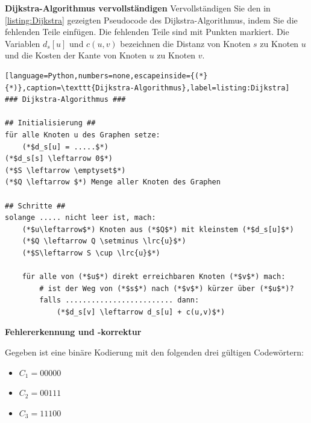 \begin{questions}
\clearpage

\question[3]
\textbf{Dijkstra-Algorithmus vervollständigen}
Vervollständigen Sie den in \cref{listing:Dijkstra} gezeigten Pseudocode des Dijkstra-Algorithmus, indem Sie die fehlenden Teile einfügen. Die fehlenden Teile sind mit Punkten markiert. Die Variablen $d_s[u]$ und $c(u,v)$ bezeichnen die Distanz von Knoten $s$ zu Knoten $u$ und die Kosten der Kante von Knoten $u$ zu Knoten $v$.
\begin{lstlisting}[language=Python,numbers=none,escapeinside={(*}{*)},caption=\texttt{Dijkstra-Algorithmus},label=listing:Dijkstra]
### Dijkstra-Algorithmus ###

## Initialisierung ##
für alle Knoten u des Graphen setze:
    (*$d_s[u] = .....$*)
(*$d_s[s] \leftarrow 0$*)
(*$S \leftarrow \emptyset$*)
(*$Q \leftarrow $*) Menge aller Knoten des Graphen

## Schritte ##
solange ..... nicht leer ist, mach:
    (*$u\leftarrow$*) Knoten aus (*$Q$*) mit kleinstem (*$d_s[u]$*)
    (*$Q \leftarrow Q \setminus \lrc{u}$*)
    (*$S\leftarrow S \cup \lrc{u}$*)

    für alle von (*$u$*) direkt erreichbaren Knoten (*$v$*) mach:
        # ist der Weg von (*$s$*) nach (*$v$*) kürzer über (*$u$*)?
        falls ......................... dann:
            (*$d_s[v] \leftarrow d_s[u] + c(u,v)$*)
\end{lstlisting}


\clearpage


\question
\textbf{Fehlererkennung und -korrektur}

Gegeben ist eine binäre Kodierung mit den folgenden drei gültigen Codewörtern:
\begin{itemize}
	\item $C_1 = 00000$
	\item $C_2 = 00111$
	\item $C_3 = 11100$
\end{itemize}

\end{questions}
